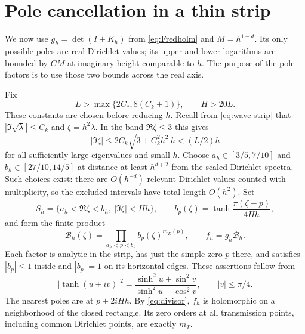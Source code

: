 \documentclass[11pt,a4paper]{article}
\theoremstyle{remark}
\numberwithin{equation}{section}
\begin{document}
\section{Pole cancellation in a thin strip}\label{sec:strip}

We now use $g_h=\det(I+K_h)$ from \eqref{eq:Fredholm} and
$M=h^{1-d}$. Its only possible poles are real Dirichlet values; its
upper and lower logarithms are bounded by $CM$ at imaginary height
comparable to $h$. The purpose of the pole factors is to use those two
bounds across the real axis.

Fix
\begin{equation}\label{eq:heights}
 L>\max\{2C_*,8(C_k+1)\},\qquad H>20L.
\end{equation}
These constants are chosen before reducing $h$. Recall from
\eqref{eq:wave-strip} that $|\Im\sqrt\lambda|\le C_k$ and
$\zeta=h^2\lambda$. In the band $\Re\zeta\le3$ this gives
\[
 |\Im\zeta|\le2C_k\sqrt{3+C_k^2h^2}\,h<(L/2)h
\]
for all sufficiently large eigenvalues and small $h$.
Choose $a_h\in[3/5,7/10]$ and $b_h\in[27/10,14/5]$ at distance
at least $h^{d+2}$ from the scaled Dirichlet spectra. Such choices exist:
there are $O(h^{-d})$ relevant Dirichlet values counted with multiplicity,
so the excluded intervals have total length $O(h^2)$. Set
\[
 S_h=\{a_h<\Re\zeta<b_h,\ |\Im\zeta|<Hh\},\qquad
 b_p(\zeta)=\tanh\frac{\pi(\zeta-p)}{4Hh},
\]
and form the finite product
\begin{equation}\label{eq:pole-product}
 \mathcal B_h(\zeta)=\prod_{a_h<p<b_h}b_p(\zeta)^{m_D(p)},\qquad
 f_h=g_h\mathcal B_h.
\end{equation}
Each factor is analytic in the strip, has just the simple zero $p$
there, and satisfies $|b_p|\le1$ inside and $|b_p|=1$ on its horizontal
edges. These assertions follow from
\begin{equation}\label{eq:tanh-modulus}
 |\tanh(u+iv)|^2=
 \frac{\sinh^2u+\sin^2v}{\sinh^2u+\cos^2v},\qquad |v|\le\pi/4.
\end{equation}
The nearest poles are at $p\pm2iHh$. By \eqref{eq:divisor}, $f_h$
is holomorphic on a neighborhood of the closed rectangle. Its zero
orders at all transmission points, including common Dirichlet points,
are exactly $m_T$.
\end{document}

